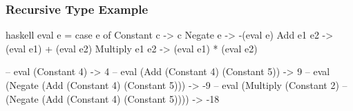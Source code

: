 \documentclass[dvipsnames]{beamer}
\theoremstyle{plain}
\begin{document}
\begin{frame}[fragile]
  \frametitle{Recursive Type Example}

  \begin{example}
    \pause
    \begin{pygments}{haskell}
eval e =
    case e of
      Constant c -> c
      Negate e -> -(eval e)
      Add e1 e2 -> (eval e1) + (eval e2)
      Multiply e1 e2 -> (eval e1) * (eval e2)

-- eval (Constant 4) -> 4
-- eval (Add (Constant 4) (Constant 5)) -> 9
-- eval (Negate (Add (Constant 4) (Constant 5))) -> -9
-- eval (Multiply (Constant 2)
--         (Negate (Add (Constant 4) (Constant 5)))) -> -18
    \end{pygments}
  \end{example}
\end{frame}
% 
% 
% 
\end{document}
